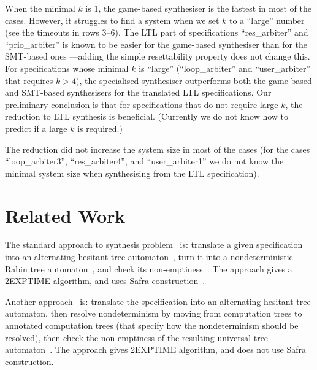 When the minimal $k$ is 1,
the game-based synthesiser is the fastest in most of the cases.
However, it struggles to find a system when we set $k$ to a ``large'' number
(see the timeouts in rows 3--6).
The LTL part of specifications ``res\_arbiter'' and ``prio\_arbiter''
is known to be easier for the game-based synthesiser than for the SMT-based ones%
---adding the simple resettability property does not change this.
For \CTLstar specifications whose minimal $k$ is ``large'' (``loop\_arbiter'' and ``user\_arbiter'' that requires $k>4$),
the specialised \CTLstar synthesiser outperforms
both the game-based and SMT-based synthesisers for the translated LTL specifications.
Our preliminary conclusion is that for \CTLstar specifications that do not require large $k$,
the reduction to LTL synthesis is beneficial.
(Currently we do not know how to predict if a large $k$ is required.)

The reduction did not increase the system size in most of the cases
(for the cases ``loop\_arbiter3'', ``res\_arbiter4'', and ``user\_arbiter1''
 we do not know the minimal system size when synthesising from the LTL specification).


\iffinal
\else
\section{Related Work} \label{sec:related}



The standard approach to \CTLstar synthesis problem~\cite{informatio} is:
translate a given \CTLstar specification into an alternating hesitant tree automaton~\cite{ATA},
turn it into a nondeterministic Rabin tree automaton~\cite{MS95},
and check its non-emptiness~\cite{Rab70}.
The approach gives a 2EXPTIME algorithm, and uses Safra construction~\cite{Safra}.

Another approach~\cite{ATLSatisfiability,ScheweThesis} is:
translate the specification into an alternating hesitant tree automaton,
then resolve nondeterminism by moving from computation trees to annotated computation trees
(that specify how the nondeterminism should be resolved),
then check the non-emptiness of the resulting universal tree automaton~\cite{XXX}.
The approach gives 2EXPTIME algorithm, and does not use Safra construction.

